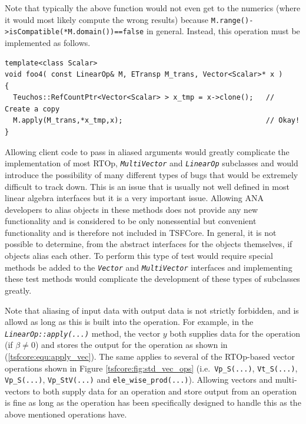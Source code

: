 {}\noindent{}Note that typically the above function would not even get
to the numerics (where it would most likely compute the wrong results)
because {}\texttt{M.range()->isCompatible(*M.domain())==false} in
general.  Instead, this operation must be implemented as follows.

{\scriptsize\begin{verbatim}
template<class Scalar>
void foo4( const LinearOp& M, ETransp M_trans, Vector<Scalar>* x )
{
  Teuchos::RefCountPtr<Vector<Scalar> > x_tmp = x->clone();   // Create a copy
  M.apply(M_trans,*x_tmp,x);                                  // Okay!
}
\end{verbatim}}

{}\noindent{}Allowing client code to pass in aliased arguments would
greatly complicate the implementation of most RTOp,
{}\texttt{\textit{Multi\-Vector}} and {}\texttt{\textit{LinearOp}}
subclasses and would introduce the possibility of many different types
of bugs that would be extremely difficult to track down.  This is an
issue that is usually not well defined in most linear algebra
interfaces but it is a very important issue.  Allowing ANA developers
to alias objects in these methods does not provide any new
functionality and is considered to be only nonessential but convenient
functionality and is therefore not included in TSFCore.  In general,
it is not possible to determine, from the abstract interfaces for the
objects themselves, if objects alias each other.  To perform this type
of test would require special methods be added to the
{}\texttt{\textit{Vector}} and {}\texttt{\textit{Multi\-Vector}}
interfaces and implementing these test methods would complicate the
development of these types of subclasses greatly.

Note that aliasing of input data with output data is not strictly
forbidden, and is allowd as long as this is built into the operation.
For example, in the {}\texttt{\textit{LinearOp\-::apply(\-...)}}
method, the vector $y$ both supplies data for the operation (if $\beta
\ne 0$) and stores the output for the operation as shown in
(\ref{tsfcore:equ:apply_vec}).  The same applies to several of the
RTOp-based vector operations shown in Figure
{}\ref{tsfcore:fig:std_vec_ops} (i.e.~\texttt{Vp\_S(...)},
{}\texttt{Vt\_S(...)}, {}\texttt{Vp\_S(...)}, {}\texttt{Vp\_StV(...)}
and {}\texttt{ele\_wise\_prod(...)}).  Allowing vectors and
multi-vectors to both supply data for an operation and store output
from an operation is fine as long as the operation has been
specifically designed to handle this as the above mentioned operations
have.

